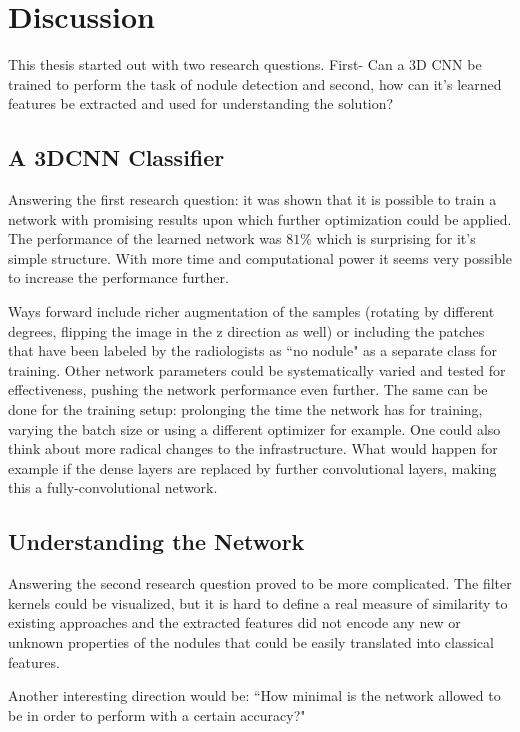 \documentclass[main.tex]{subfiles}
\begin{document}
\chapter{Discussion}\label{chap:discussion}

This thesis started out with two research questions. First- Can a 3D CNN be trained to perform the task of nodule detection and second, how can it's learned features be extracted and used for understanding the solution? 

\section{A 3DCNN Classifier}
Answering the first research question: it was shown that it is possible to train a network with promising results upon which further optimization could be applied. The performance of the learned network was $81\%$ which is surprising for it's simple structure. With more time and computational power it seems very possible to increase the performance further. 

Ways forward include richer augmentation of the samples (rotating by different degrees, flipping the image in the z direction as well) or including the patches that have been labeled by the radiologists as ``no nodule" as a separate class for training. Other network parameters could be systematically varied and tested for effectiveness, pushing the network performance even further. The same can be done for the training setup: prolonging the time the network has for training, varying the batch size or using a different optimizer for example. One could also think about more radical changes to the infrastructure. What would happen for example if the dense layers are replaced by further convolutional layers, making this a fully-convolutional network.

\section{Understanding the Network}
Answering the second research question proved to be more complicated. The filter kernels could be  visualized, but it is hard to define a real measure of similarity to existing approaches and the extracted features did not encode any new or unknown properties of the nodules that could be easily translated into classical features.


Another interesting direction would be: ``How minimal is the network allowed to be in order to perform with a certain accuracy?"
\end{document}
